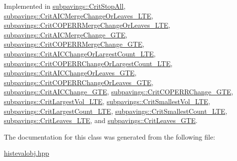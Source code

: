 \-Implemented in \hyperlink{classsubpavings_1_1CritStopAll_abb2e5e76fa76aadbd77ad4108c1d9c4e}{subpavings\-::\-Crit\-Stop\-All}, \hyperlink{classsubpavings_1_1CritAICMergeChangeOrLeaves__LTE_a5f6d984852a0ee94e92f2a9f28e74953}{subpavings\-::\-Crit\-A\-I\-C\-Merge\-Change\-Or\-Leaves\-\_\-\-L\-T\-E}, \hyperlink{classsubpavings_1_1CritCOPERRMergeChangeOrLeaves__LTE_a7ddbaf53665373ee069626351e40252c}{subpavings\-::\-Crit\-C\-O\-P\-E\-R\-R\-Merge\-Change\-Or\-Leaves\-\_\-\-L\-T\-E}, \hyperlink{classsubpavings_1_1CritAICMergeChange__GTE_abcd88342d6ebe8ae0eac08a834ac1bc5}{subpavings\-::\-Crit\-A\-I\-C\-Merge\-Change\-\_\-\-G\-T\-E}, \hyperlink{classsubpavings_1_1CritCOPERRMergeChange__GTE_a00c06b462c0224bf90e06c130069bd13}{subpavings\-::\-Crit\-C\-O\-P\-E\-R\-R\-Merge\-Change\-\_\-\-G\-T\-E}, \hyperlink{classsubpavings_1_1CritAICChangeOrLargestCount__LTE_acf02a98ad7e8268ba30b38d4b15c45e7}{subpavings\-::\-Crit\-A\-I\-C\-Change\-Or\-Largest\-Count\-\_\-\-L\-T\-E}, \hyperlink{classsubpavings_1_1CritCOPERRChangeOrLargestCount__LTE_ab43c4004ba53bd65bb94122dbdbc5c32}{subpavings\-::\-Crit\-C\-O\-P\-E\-R\-R\-Change\-Or\-Largest\-Count\-\_\-\-L\-T\-E}, \hyperlink{classsubpavings_1_1CritAICChangeOrLeaves__GTE_ad41d362796c0f10185375bb5a3ce5d0b}{subpavings\-::\-Crit\-A\-I\-C\-Change\-Or\-Leaves\-\_\-\-G\-T\-E}, \hyperlink{classsubpavings_1_1CritCOPERRChangeOrLeaves__GTE_a596ce8ff433ffac12d110c1ee0a6faab}{subpavings\-::\-Crit\-C\-O\-P\-E\-R\-R\-Change\-Or\-Leaves\-\_\-\-G\-T\-E}, \hyperlink{classsubpavings_1_1CritAICChange__GTE_a39c3228add1aa1f3f6bba7148d3e0e1b}{subpavings\-::\-Crit\-A\-I\-C\-Change\-\_\-\-G\-T\-E}, \hyperlink{classsubpavings_1_1CritCOPERRChange__GTE_ad08dfb82007a802cd298e97e7264bbe9}{subpavings\-::\-Crit\-C\-O\-P\-E\-R\-R\-Change\-\_\-\-G\-T\-E}, \hyperlink{classsubpavings_1_1CritLargestVol__LTE_a47c51f066e79dc7809b07e6e7e235aee}{subpavings\-::\-Crit\-Largest\-Vol\-\_\-\-L\-T\-E}, \hyperlink{classsubpavings_1_1CritSmallestVol__LTE_ab95576c1a6d7cf1f39ade29f44126212}{subpavings\-::\-Crit\-Smallest\-Vol\-\_\-\-L\-T\-E}, \hyperlink{classsubpavings_1_1CritLargestCount__LTE_a5b49847102d683709b9f4dbea40ff4a8}{subpavings\-::\-Crit\-Largest\-Count\-\_\-\-L\-T\-E}, \hyperlink{classsubpavings_1_1CritSmallestCount__LTE_a827ca361ea6386926931f7bb3f618797}{subpavings\-::\-Crit\-Smallest\-Count\-\_\-\-L\-T\-E}, \hyperlink{classsubpavings_1_1CritLeaves__LTE_a09d5d8f311bd0b811208e329a26514a5}{subpavings\-::\-Crit\-Leaves\-\_\-\-L\-T\-E}, and \hyperlink{classsubpavings_1_1CritLeaves__GTE_a7427f4b81f72996bd756d9f22bc8c330}{subpavings\-::\-Crit\-Leaves\-\_\-\-G\-T\-E}.



\-The documentation for this class was generated from the following file\-:\begin{DoxyCompactItemize}
\item 
\hyperlink{histevalobj_8hpp}{histevalobj.\-hpp}\end{DoxyCompactItemize}

